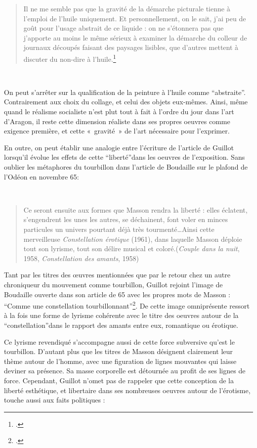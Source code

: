 \begin{quote}
Il ne me semble pas que la gravité de la démarche picturale tienne à l’emploi de l’huile uniquement. Et personnellement, on le sait, j’ai peu de goût pour l’usage abstrait de ce liquide : on ne s’étonnera pas que j’apporte au moins le même sérieux à examiner la démarche du colleur de journaux découpés faisant des paysages lisibles, que d’autres mettent à discuter du non-dire à l’huile.\footcite{hoffmeister}\end{quote}
 

	 On peut s’arrêter sur la qualification de la peinture à l’huile comme \enquote{abstraite}. Contrairement aux choix du collage, et celui des objets eux-mêmes. Ainsi, même quand le réalisme socialiste n’est plut tout à fait à l’ordre du jour dans l’art d’Aragon, il reste cette dimension réaliste dans ses propres oeuvres comme exigence première, et cette « gravité » de l’art nécessaire pour l’exprimer.

En outre, on peut établir une analogie entre l’écriture de l’article de Guillot lorsqu'il évolue les effets de cette \enquote{liberté}dans les oeuvres de l’exposition. Sans oublier les métaphores du tourbillon dans l’article de Boudaille sur le plafond de l’Odéon en novembre 65: 

 \begin{quote}
Ce seront ensuite aux formes que Masson rendra la liberté : elles éclatent, s’engendrent les unes les autres, se déchainent, font voler en minces particules un univers pourtant déjà très tourmenté…Ainsi cette merveilleuse \emph{Constellation érotique} (1961), dans laquelle Masson déploie tout son lyrisme, tout son délire musical et coloré.(\emph{Couple dans la nuit}, 1958, \emph{Constellation des amants}, 1958)	
\end{quote}

	Tant par les titres des \oe{}uvres mentionnées que par le retour chez un autre chroniqueur du mouvement comme tourbillon, Guillot rejoint l’image de Boudaille ouverte dans son article de 65 avec les propres mots de Masson : \enquote{Comme une constellation tourbillonnant}\footcite{avantinauguration}. De cette image omniprésente ressort à la fois une forme de lyrisme cohérente avec le titre des oeuvres autour de la \enquote{constellation}dans le rapport des amants entre eux, romantique ou érotique. 

Ce lyrisme revendiqué s’accompagne aussi de cette force subversive qu’est le tourbillon. D’autant plus que les titres de Masson désignent clairement leur thème autour de l’homme, avec une figuration de lignes mouvantes qui laisse deviner sa présence. Sa masse corporelle est détournée au profit de ses lignes de force. Cependant, Guillot n’omet pas de rappeler que cette conception de la liberté esthétique, et libertaire dans ses nombreuses oeuvres autour de l’érotisme, touche aussi aux faits politiques : 

